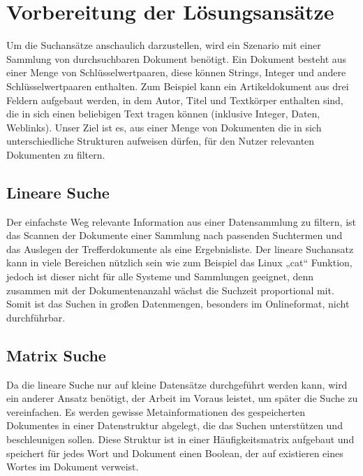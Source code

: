 \section[Vorbereitung der Lösungsansätze]{Vorbereitung der Lösungsansätze}
Um die Suchansätze anschaulich darzustellen, wird ein Szenario mit einer
Sammlung von durchsuchbaren Dokument benötigt. Ein Dokument besteht aus
einer Menge von Schlüsselwertpaaren, diese können Strings, Integer und
andere Schlüsselwertpaaren enthalten. Zum Beispiel kann ein
Artikeldokument aus drei Feldern aufgebaut werden, in dem Autor, Titel
und Textkörper enthalten sind, die in sich einen beliebigen Text tragen
können (inklusive Integer, Daten, Weblinks). 
\newline
Unser Ziel ist es, aus einer Menge von Dokumenten die in sich
unterschiedliche Strukturen aufweisen dürfen, für den Nutzer relevanten
Dokumenten zu filtern.


\subsection[Lineare Suche]{Lineare Suche}
Der einfachste Weg relevante Information aus einer Datensammlung zu
filtern, ist das Scannen der Dokumente einer Sammlung nach passenden
Suchtermen und das Auslegen der Trefferdokumente als eine
Ergebnisliste. Der lineare Suchansatz kann in viele Bereichen nützlich
sein wie zum Beispiel das Linux „cat“ Funktion, jedoch ist dieser nicht
für alle Systeme und Sammlungen geeignet, denn zusammen mit der
Dokumentenanzahl wächst die Suchzeit proportional mit. 
\newline
Somit ist das Suchen in großen Datenmengen, %
besonders im Onlineformat, nicht durchführbar.

\subsection[Matrix Suche]{Matrix Suche}

Da die lineare Suche nur auf kleine Datensätze durchgeführt werden kann,
wird ein anderer Ansatz benötigt, der Arbeit im Voraus leistet, um
später die Suche zu vereinfachen. Es werden gewisse Metainformationen
des gespeicherten Dokumentes in einer Datenstruktur abgelegt, die das
Suchen unterstützen und beschleunigen sollen. 
\newline
Diese Struktur ist in einer Häufigkeitsmatrix aufgebaut und speichert
für jedes Wort und Dokument einen Boolean, der auf existieren eines
Wortes im Dokument verweist.

